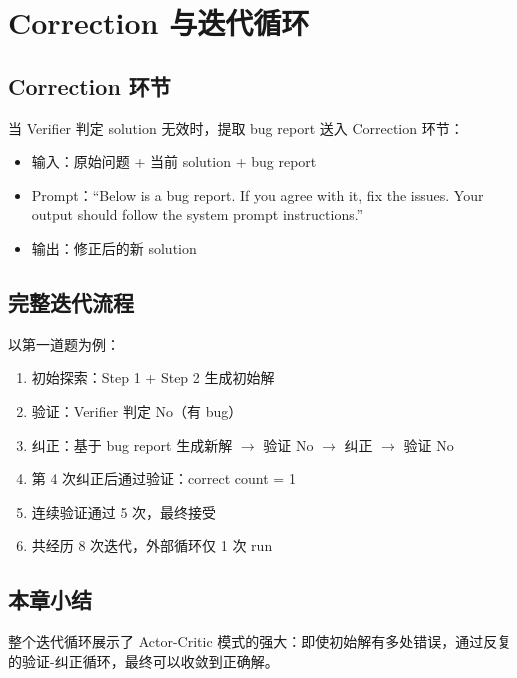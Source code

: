 \section{Correction 与迭代循环}

\subsection{Correction 环节}

当 Verifier 判定 solution 无效时，提取 bug report 送入 Correction 环节：
\begin{itemize}
    \item 输入：原始问题 + 当前 solution + bug report
    \item Prompt：``Below is a bug report. If you agree with it, fix the issues. Your output should follow the system prompt instructions.''
    \item 输出：修正后的新 solution
\end{itemize}

\subsection{完整迭代流程}

以第一道题为例：
\begin{enumerate}
    \item 初始探索：Step 1 + Step 2 生成初始解
    \item 验证：Verifier 判定 No（有 bug）
    \item 纠正：基于 bug report 生成新解 $\rightarrow$ 验证 No $\rightarrow$ 纠正 $\rightarrow$ 验证 No
    \item 第 4 次纠正后通过验证：correct count = 1
    \item 连续验证通过 5 次，最终接受
    \item 共经历 8 次迭代，外部循环仅 1 次 run
\end{enumerate}

\subsection{本章小结}

整个迭代循环展示了 Actor-Critic 模式的强大：即使初始解有多处错误，通过反复的验证-纠正循环，最终可以收敛到正确解。

